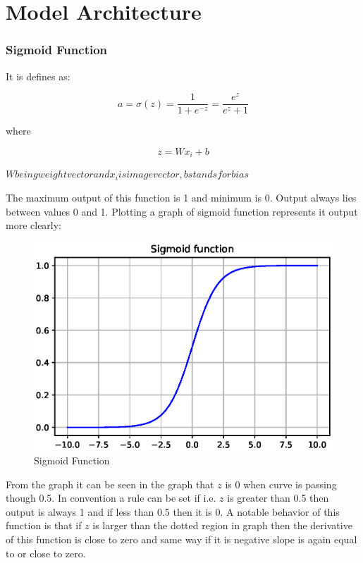 \documentclass[11pt]{article}
\begin{document}

\section{Model Architecture}

\subsubsection{Sigmoid Function}
It is defines as:

\begin{equation}
a = \sigma(z) = \frac{1}{1+e^{-z}}=\frac{e^{z}}{e^{z}+1}
\end{equation}

where

\begin{equation}
z = Wx_i + b
\end{equation}

$W being weight vector and x_i is image vector, b stands for bias$


The maximum output of this function is 1 and minimum is 0. Output always lies between values 0 and 1. Plotting a graph of sigmoid function represents it output more clearly:

\begin{figure}[ht!]
	\centering
	\includegraphics[width=.6\linewidth]{files/cnn_architecture/sigmoid.eps}
	\caption{Sigmoid Function}
	\label{fig: Sigmoid}
\end{figure}

From the graph it can be seen in the graph that $z$ is 0 when curve is passing though 0.5. In convention a rule can be set if i.e. $z$ is greater than 0.5 then output is always 1 and if less than 0.5 then it is 0. A notable behavior of this function is that if $z$ is larger than the dotted region in graph then the derivative of this function is close to zero and same way if it is negative slope is again equal to or close to zero. 
\end{document}
